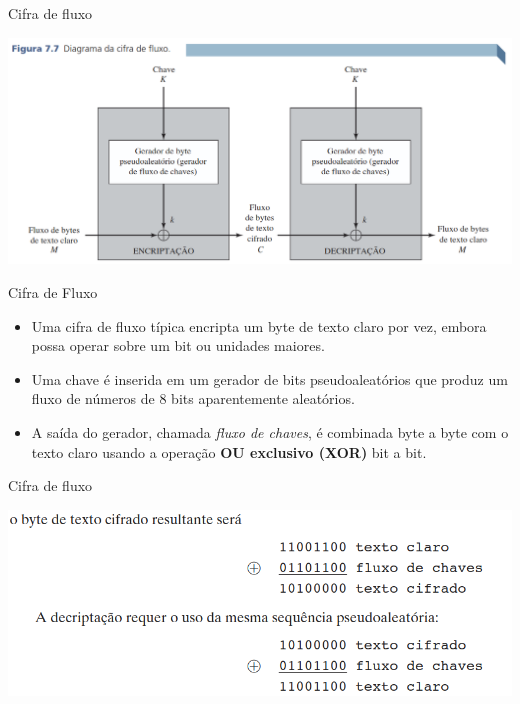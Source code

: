 \begin{frame}{Cifra de fluxo}



    \includegraphics[width=\linewidth]{Figuras/Cifra-de-fluxo.png}



\end{frame}


\begin{frame}{Cifra de Fluxo}
    \begin{itemize}

        \item Uma cifra de fluxo típica encripta um byte de texto claro por vez, embora possa operar sobre um bit ou unidades maiores.
        \item Uma chave é inserida em um gerador de bits pseudoaleatórios que produz um fluxo de números de 8 bits aparentemente aleatórios.
        \item A saída do gerador, chamada \textit{fluxo de chaves}, é combinada byte a byte com o texto claro usando a operação \textbf{OU exclusivo (XOR)} bit a bit.

    \end{itemize}
\end{frame}

\begin{frame}{Cifra de fluxo}



    \includegraphics[width=\linewidth]{Figuras/xor-cifrado-fluxo.png}



\end{frame}


